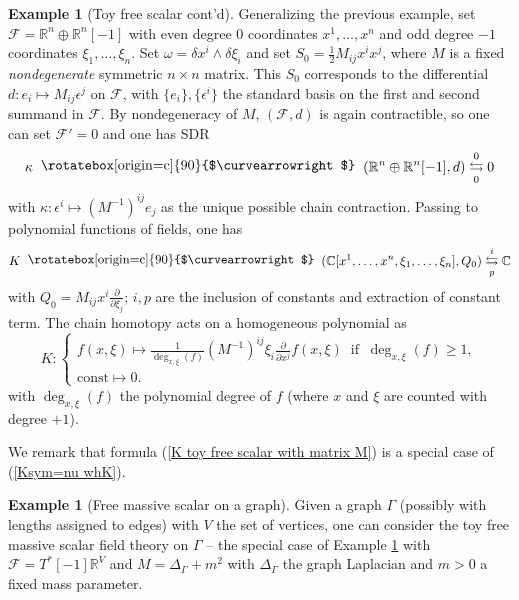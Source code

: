 \documentclass{amsart}
\theoremstyle{plain} %
\theoremstyle{definition}
\newtheorem{expl}[thm]{Example}
\theoremstyle{remark}
\newcommand{\mr}{\mathrm}
\newcommand{\F}{\mathcal{F}}
\newcommand{\RR}{\mathbb{R}}
\newcommand{\CC}{\mathbb{C}}
\newcommand{\SDR}[5]{#5\;\;\raisebox{1.3pt}{\rotatebox[origin=c]{90}{$\curvearrowright$}}\;\; #1 \underset{#4}{\stackrel{#3}{\leftrightarrows}} #2}  %
\begin{document}
\begin{expl}[Toy free scalar cont'd]\label{example: toy scalar field with matrix M}
    Generalizing the previous example, set $\F=\RR^n\oplus \RR^n[-1]$ with even degree $0$ coordinates $x^1,\ldots,x^n$ and odd degree $-1$ coordinates $\xi_1,\ldots,\xi_n$. Set $\omega=\delta x^i\wedge \delta\xi_i$ and set $S_0 =\frac12 M_{ij} x^i x^j$, where $M$ is a fixed \emph{nondegenerate} symmetric $n\times n$ matrix. This $S_0$ corresponds to the differential $d\colon e_i\mapsto M_{ij}\epsilon^j$ on $\F$, with $\{e_i\},\{\epsilon^i\}$ the standard basis on the first and second summand in $\F$. By nondegeneracy of $M$, $(\F,d)$ is again contractible, so one can set $\F'=0$ and one has SDR
    \begin{equation}
        \SDR{(\RR^n\oplus \RR^n[-1],d)}{0}{0}{0}{\kappa}
    \end{equation}
    with $\kappa\colon \epsilon^i\mapsto (M^{-1})^{ij}e_j$ as the unique possible chain contraction. Passing to polynomial functions of fields, one has
    \begin{equation}
        \SDR{(\CC[x^1,\ldots,x^n,\xi_1,\ldots,\xi_n],Q_0)}{\CC}{i}{p}{K}
    \end{equation}
    with $Q_0=M_{ij}x^i\frac{\partial}{\partial\xi_j}$; $i,p$ are the inclusion of constants and extraction of constant term. The chain homotopy acts on a homogeneous polynomial as
    \begin{equation}\label{K toy free scalar with matrix M}
        K\colon 
        \begin{cases}
        f(x,\xi) \mapsto\frac{1}{\deg_{x,\xi}(f)}(M^{-1})^{ij}\xi_i \frac{\partial}{\partial x^j}f(x,\xi)\;\;\mr{if}\;\; \deg_{x,\xi}(f)\geq 1,\\
        \mr{const} \mapsto 0.
        \end{cases}
    \end{equation}
    with $\deg_{x,\xi}(f)$ the polynomial degree of $f$ (where $x$ and $\xi$ are counted with degree $+1$).

    We remark that formula (\ref{K toy free scalar with matrix M}) is a special case of (\ref{Ksym=nu whK}).
\end{expl}

\begin{expl}[Free massive scalar on a graph]
    Given a graph $\Gamma$ (possibly with lengths assigned to edges) with $V$ the set of vertices, one can consider the toy free massive scalar field theory on $\Gamma$ -- the special case of Example \ref{example: toy scalar field with matrix M} with $\F=T^*[-1]\RR^V$ and $M=\Delta_\Gamma+m^2$ with $\Delta_\Gamma$ the graph Laplacian and $m>0$ a fixed mass parameter.
\end{expl}
\end{document}
